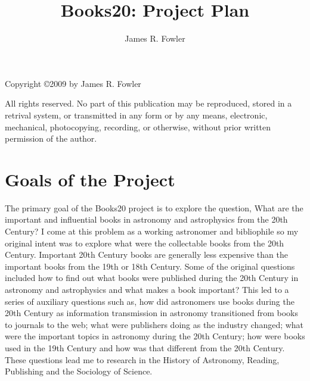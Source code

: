 \documentclass{article}%
\begin{document}
\title{Books20: Project Plan}
\author{James R. Fowler}
\maketitle
\vfil\eject

\vspace*{5 in}
Copyright \copyright 2009 by James R. Fowler

All rights reserved. No part of this publication may be
reproduced, stored in a retrival system, or transmitted
in any form or by any means, electronic, mechanical,
photocopying, recording, or otherwise, without prior written
permission of the author.

\vfil\eject

%
%
\section{Goals of the Project}
The primary goal of the Books20 project is to explore the question,
What are the important and influential books in astronomy and
astrophysics from the 20th Century? I come at this problem as a
working astronomer and bibliophile so my original intent was to
explore what were the collectable books from the 20th
Century. Important 20th Century books are generally less expensive
than the important books from the 19th or 18th Century.  Some of the
original questions included how to find out what books were published
during the 20th Century in astronomy and astrophysics and what makes a
book important? This led to a series of auxiliary questions such as,
how did astronomers use books during the 20th Century as information
transmission in astronomy transitioned from books to journals to the
web; what were publishers doing as the industry changed; what were the
important topics in astronomy during the 20th Century; how were books
used in the 19th Century and how was that different from the 20th
Century.  These questions lead me to research in the History of
Astronomy, Reading, Publishing and the Sociology of Science.
\end{document}
